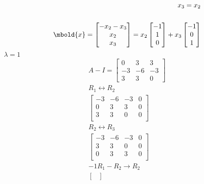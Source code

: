 \documentclass[12pt letter]{report}
\begin{document}
{{\begin{enumerate}
\begin{align*}
              x_3 = x_2                    \\
              \\
              \mbold{x} = \begin{bmatrix} -x_2 - x_3 \\ x_2 \\ x_3 \end{bmatrix} = x_2 \begin{bmatrix} -1 \\ 1 \\ 0
                                                                                       \end{bmatrix} + x_3 \begin{bmatrix} -1 \\ 0 \\ 1 \end{bmatrix}
            \end{align*}
            $\lambda = 1$
            \begin{align*}
              A - I = \begin{bmatrix}
                        0  & 3  & 3  \\
                        -3 & -6 & -3 \\
                        3  & 3  & 0
                      \end{bmatrix}       \\
              R_1 \leftrightarrow R_2      \\
              \begin{bmatrix}
                -3 & -6 & -3 & 0 \\
                0  & 3  & 3  & 0 \\
                3  & 3  & 0  & 0 \\
              \end{bmatrix}
              \\
              R_2 \leftrightarrow R_3      \\
              \begin{bmatrix}
                -3 & -6 & -3 & 0 \\
                3  & 3  & 0  & 0 \\
                0  & 3  & 3  & 0 \\
              \end{bmatrix}
              \\
              -1R_1 - R_2  \rightarrow R_2 \\
              \begin{bmatrix}

\end{bmatrix}
\end{align*}
\end{enumerate}}}
\end{document}
